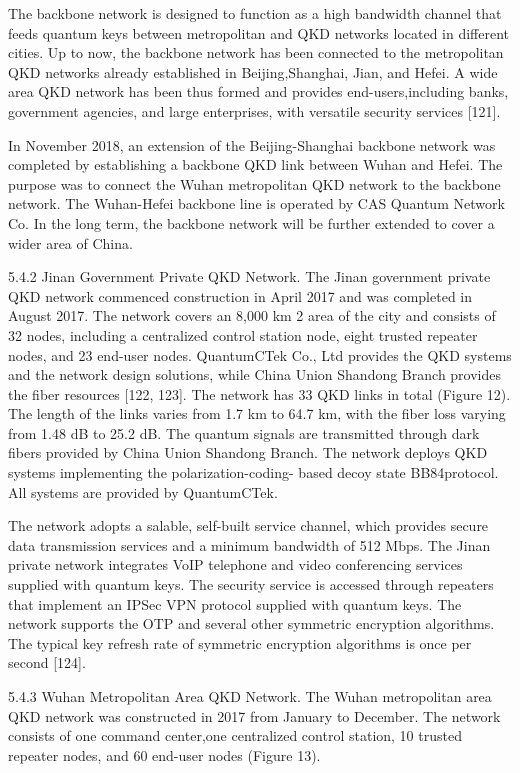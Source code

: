 The backbone network is designed to function as a high bandwidth channel that feeds quantum keys between metropolitan and QKD networks located in different cities. Up to now, the backbone network has been connected to the metropolitan QKD networks already established in Beijing,Shanghai, Jian, and Hefei. A wide area QKD network has been thus formed and provides end-users,including banks, government agencies, and large enterprises, with versatile security services [121].

In November 2018, an extension of the Beijing-Shanghai backbone network was completed by establishing a backbone QKD link between Wuhan and Hefei. The purpose was to connect the Wuhan metropolitan QKD network to the backbone network. The Wuhan-Hefei backbone line is operated by CAS Quantum Network Co. In the long term, the backbone network will be further extended to cover a wider area of China.

5.4.2 Jinan Government Private QKD Network. The Jinan government private QKD network commenced construction in April 2017 and was completed in August 2017. The network covers an 8,000 km 2 area of the city and consists of 32 nodes, including a centralized control station node, eight trusted repeater nodes, and 23 end-user nodes. QuantumCTek Co., Ltd provides the QKD systems and the network design solutions, while China Union Shandong Branch provides the fiber resources [122, 123]. The network has 33 QKD links in total (Figure 12). The length of the links varies from 1.7 km to 64.7 km, with the fiber loss varying from 1.48 dB to 25.2 dB. The quantum signals are transmitted through dark fibers provided by China Union Shandong Branch.
The network deploys QKD systems implementing the polarization-coding- based decoy state BB84protocol. All systems are provided by QuantumCTek.

The network adopts a salable, self-built service channel, which provides secure data transmission services and a minimum bandwidth of 512 Mbps. The Jinan private network integrates VoIP telephone and video conferencing services supplied with quantum keys. The security service is accessed through repeaters that implement an IPSec VPN protocol supplied with quantum keys.
The network supports the OTP and several other symmetric encryption algorithms. The typical key refresh rate of symmetric encryption algorithms is once per second [124].

5.4.3 Wuhan Metropolitan Area QKD Network. The Wuhan metropolitan area QKD network was constructed in 2017 from January to December. The network consists of one command center,one centralized control station, 10 trusted repeater nodes, and 60 end-user nodes (Figure 13).

